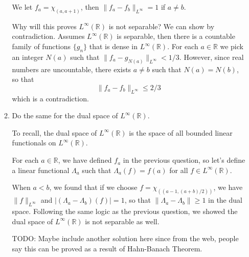 \documentclass{article}
\begin{document}
\begin{enumerate}
\begin{enumerate}
        \begin{solution}
            We let $f_a=\chi_{(a, a+1)}$, then $\|f_a-f_b\|_{L^\infty} = 1$ if $a\neq b$.

            Why will this proves $L^\infty(\mathbb R)$ is not separable? We can show by contradiction.
            Assumes $L^\infty(\mathbb R)$ is separable, then there is a countable family of functions $\{g_n\}$
            that is dense in $L^\infty(\mathbb R)$.
            For each $a\in\mathbb R$ we pick an integer $N(a)$ such that $\|f_a - g_{N(a)}\|_{L^\infty} < 1/3$.
            However, since real numbers are uncountable, there exists $a\neq b$ such that $N(a)=N(b)$, so that
            $$\|f_a-f_b\|_{L^\infty} \leq 2/3$$
            which is a contradiction.
        \end{solution}

        \item Do the same for the dual space of $L^\infty(\mathbb R)$.

        \begin{solution}
            To recall, the dual space of $L^\infty(\mathbb R)$ is the space of all bounded linear functionals
            on $L^\infty(\mathbb R)$.

            For each $a\in \mathbb R$, we have defined $f_a$ in the previous question, so let's define a linear functional
            $\Lambda_a$ such that $\Lambda_a(f) = f(a)$ for all $f\in L^\infty(\mathbb R)$.

            When $a< b$, we found that if we choose $f=\chi_{((a-1, (a+b)/2))}$, we have $\|f\|_{L^\infty}$ and $|(\Lambda_a-\Lambda_b)(f)| = 1$,
            so that $\|\Lambda_a - \Lambda_b\|\geq 1$ in the dual space. Following the same logic as the previous question, we showed
            the dual space of $L^\infty(\mathbb R)$ is not separable as well.

            TODO: Maybe include another solution here since from the web, people say this can be proved as a result of Hahn-Banach Theorem.
        \end{solution}
    \end{enumerate}
\end{enumerate}
\end{document}
